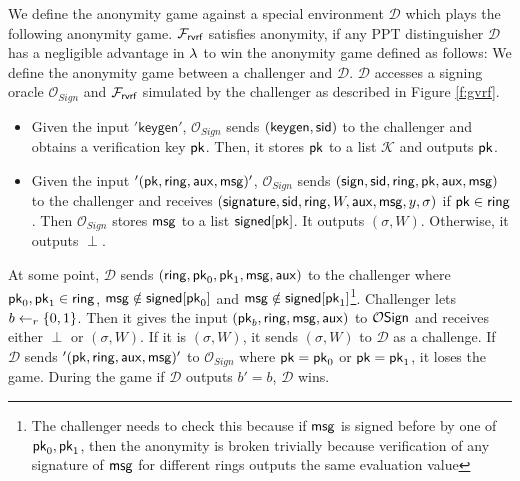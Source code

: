 	\begin{definition}[Anonymity]\label{def:anonymity} We define the anonymity game against a special environment $ \mathcal{D} $ which plays the following anonymity game.
		$ \mathcal{F}_{\textsf{rvrf}} $ satisfies anonymity, if any PPT distinguisher $ \mathcal{D} $ has a negligible advantage in $ \lambda $ to win the anonymity game defined as follows:
		We define the anonymity game between a challenger and $ \mathcal{D} $.  $\mathcal{D}$ accesses a signing oracle $ \mathcal{O}_{Sign} $ and $ \mathcal{F}_{\textsf{rvrf}} $ simulated by the challenger as described in Figure \ref{f:gvrf}. 
		\begin{itemize}
			\item Given the input $ '\mathsf{keygen}' $, $\mathcal{O}_{Sign} $ sends $ (\mathsf{keygen, \textsf{sid}}) $ to the challenger and obtains a verification key $ \mathsf{pk} $. Then, it stores $ \mathsf{pk} $ to a list $ \mathcal{K} $ and outputs $ \mathsf{pk} $.
			\item Given the input $ '(\mathsf{pk},\mathsf{ring},\mathsf{aux},\mathsf{msg})' $, $ \mathcal{O}_{Sign} $ sends $ (\mathsf{sign}, \textsf{sid},\mathsf{ring},\mathsf{pk}, \mathsf{aux}, \mathsf{msg}) $ to the challenger and receives $ (\mathsf{signature}, \textsf{sid}, \mathsf{ring}, W,\mathsf{aux}, \mathsf{msg}, y, \sigma) $ if $ \mathsf{pk} \in \mathsf{ring} $.  Then $ \mathcal{O}_{Sign} $ stores $ \mathsf{msg} $ to a list $ {\mathsf{signed}}[\mathsf{pk}]  $.
			It outputs $ (\sigma,W) $. Otherwise, it outputs $ \perp $.
		\end{itemize}
		At some point,	
		$ \mathcal{D} $ sends $ (\mathsf{ring}, \mathsf{pk}_0, \mathsf{pk}_1, \mathsf{msg},\mathsf{aux})$ to  the challenger where $ \mathsf{pk}_0, \mathsf{pk}_1 \in \mathsf{ring} $, $ \mathsf{msg}  \notin {\ensuremath{\mathsf{signed}}}[\mathsf{pk}_0]$ and $ \mathsf{msg}  \notin {\ensuremath{\mathsf{signed}}}[\mathsf{pk}_1] $\footnote{The challenger needs to check this because if $ \mathsf{msg} $ is signed before by one of $ \mathsf{pk}_0,\mathsf{pk}_1 $, then the anonymity is broken trivially because verification of any signature of $ \mathsf{msg} $ for different rings outputs the same evaluation value}.  Challenger lets $ b \leftarrow_r\{0,1\}$. Then it gives the input $ (\mathsf{pk}_b, \mathsf{ring}, \mathsf{msg},\mathsf{aux}) $ to $ \mathcal{O}\mathsf{Sign} $ and receives either $ \perp $ or $(\sigma,W)$. If it is $ (\sigma,W) $, it sends $ (\sigma,W) $ to $ \mathcal{D} $ as a challenge.
		If $ \mathcal{D} $ sends $ '(\mathsf{pk},\mathsf{ring},\mathsf{aux},\mathsf{msg})' $ to $ \mathcal{O}_{Sign} $ where $ \mathsf{pk} = \mathsf{pk}_0 $ or $ \mathsf{pk} = \mathsf{pk}_1 $, it loses the game. 
		During the game if $ \mathcal{D} $ outputs $ b' = b $, $ \mathcal{D} $ wins.
		
		
	\end{definition}
	
	
	
	
